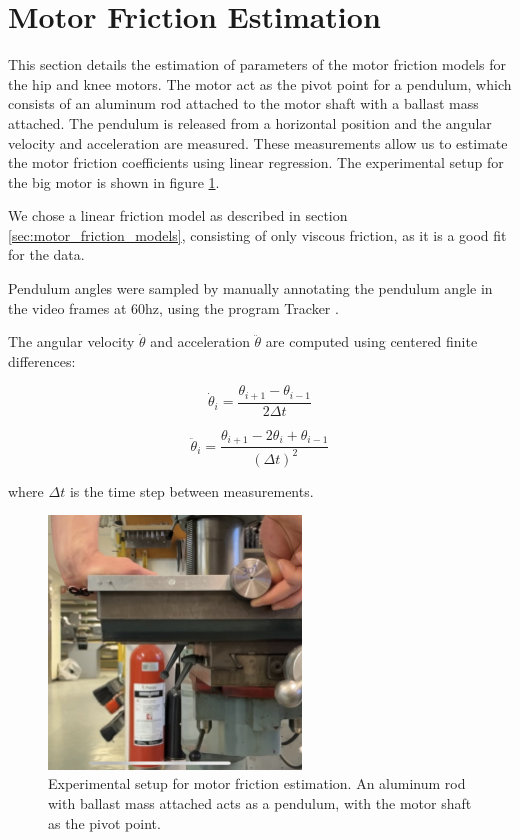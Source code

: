 \section{Motor Friction Estimation}
\label{sec:motor_friction_estimation}

This section details the estimation of parameters of the motor friction models for the hip and knee motors. The motor act as the pivot point for a pendulum, which consists of an aluminum rod attached to the motor shaft with a ballast mass attached. The pendulum is released from a horizontal position and the angular velocity and acceleration are measured. These measurements allow us to estimate the motor friction coefficients using linear regression. The experimental setup for the big motor is shown in figure \ref{fig:results:motor_friction_estimation:pendulum_setup}.

We chose a linear friction model as described in section \ref{sec:motor_friction_models}, consisting of only viscous friction, as it is a good fit for the data.

Pendulum angles were sampled by manually annotating the pendulum angle in the video frames at 60hz, using the program Tracker \cite{tracker}. 

The angular velocity \( \dot{\theta} \) and acceleration \( \ddot{\theta} \) are computed using centered finite differences:

\[
\dot{\theta}_i = \frac{\theta_{i+1} - \theta_{i-1}}{2\Delta t}
\]

\[
\ddot{\theta}_i = \frac{\theta_{i+1} - 2\theta_i + \theta_{i-1}}{(\Delta t)^2}
\]

where \(\Delta t\) is the time step between measurements.





\begin{figure}[h]
    \centering
    \includegraphics[width=0.6\textwidth]{Images/friction_estimation/big_motor.jpg}
    \caption{Experimental setup for motor friction estimation. An aluminum rod with ballast mass attached acts as a pendulum, with the motor shaft as the pivot point.}
    \label{fig:results:motor_friction_estimation:pendulum_setup}
\end{figure}

